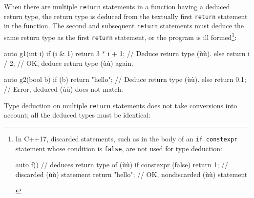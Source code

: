 When there are multiple \lstinline!return! statements in a function having
a deduced return type, the return type is deduced from the textually
first \lstinline!return! statement in the function. The second and
subsequent \lstinline!return! statements must deduce the same return type
as the first \lstinline!return! statement, or the program is ill
formed{\cprotect\footnote{In C++17, discarded statements, such as in the
body of an \lstinline!if!~\lstinline!constexpr! statement whose condition is
\lstinline!false!, are not used for type deduction:

\begin{emcppslisting}[style=footcode]
auto f()  // deduces return type of (ù{}ù)
{
    if constexpr (false) return 1;  // discarded (ù{}ù) statement
    return "hello";                 // OK, nondiscarded (ù{}ù) statement
}
\end{emcppslisting}
      }}:

\begin{emcppslisting}
auto g1(int i)
{
    if (i & 1) { return 3 * i + 1; }  // Deduce return type (ù{}ù).
    else       { return i / 2; }      // OK, deduce return type (ù{}ù) again.
}

auto g2(bool b)
{
    if (b) { return "hello"; }  // Deduce return type (ù{}ù).
    else   { return 0.1; }      // Error, deduced (ù{}ù) does not match.
}
\end{emcppslisting}
    

\noindent Type deduction on multiple \lstinline!return! statements does not take
conversions into account; all the deduced types must be identical:


